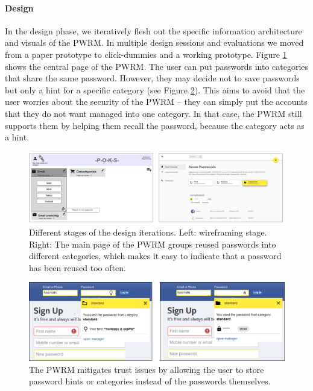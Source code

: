 \paragraph{Design} 
In the design phase, we iteratively flesh out the specific information architecture and visuals of the PWRM. In multiple design sessions and evaluations we moved from a paper prototype to click-dummies and a working prototype. Figure \ref{fig:pwrm:conceptfinal} shows the central page of the PWRM. The user can put passwords into categories that share the same password. However, they may decide not to save passwords but only a hint for a specific category (see Figure \ref{fig:pwrm:hintboxes}). This aims to avoid that the user worries about the security of the PWRM -- they can simply put the accounts that they do not want managed into one category. In that case, the PWRM still supports them by helping them recall the password, because the category acts as a hint. 

\begin{figure}[htbp]
	\centering
	\includegraphics[width=\linewidth]{figures/pwrm/concept_final}
	\caption{Different stages of the design iterations. Left: wireframing stage. Right: The main page of the PWRM groups reused passwords into different categories, which makes it easy to indicate that a password has been reused too often.}
	\label{fig:pwrm:conceptfinal}
\end{figure}

\begin{figure}[htbp]
	\centering
	\includegraphics[width=0.9\linewidth]{figures/pwrm/hintboxes}
	\caption{The PWRM mitigates trust issues by allowing the user to store password hints or categories instead of the passwords themselves.}
	\label{fig:pwrm:hintboxes}
\end{figure}

